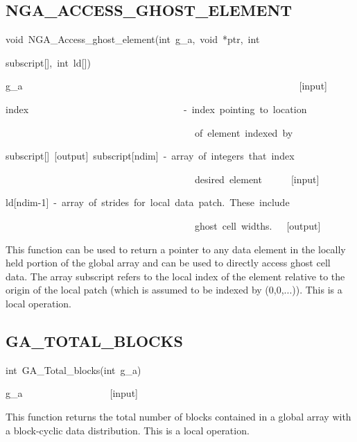 \subsection*{\label{sub:NGA_ACCESS_GHOST_ELEMENT}NGA\_ACCESS\_GHOST\_ELEMENT}
\begin{lyxcode}
void~NGA\_Access\_ghost\_element(int~g\_a,~void~{*}ptr,~int~

subscript{[}{]},~int~ld{[}{]})



g\_a~~~~~~~~~~~~~~~~~~~~~~~~~~~~~~~~~~~~~~~~~~~~~~~~~~~~~~~~~{[}input{]}~

index~~~~~~~~~~~~~~~~~~~~~~~~~~~~~~~~-~index~pointing~to~location~

~~~~~~~~~~~~~~~~~~~~~~~~~~~~~~~~~~~~~~~of~element~indexed~by~

subscript{[}{]}~{[}output{]}~subscript{[}ndim{]}~-~array~of~integers~that~index~

~~~~~~~~~~~~~~~~~~~~~~~~~~~~~~~~~~~~~~~desired~element~~~~~~{[}input{]}~

ld{[}ndim-1{]}~-~array~of~strides~for~local~data~patch.~These~include~

~~~~~~~~~~~~~~~~~~~~~~~~~~~~~~~~~~~~~~~ghost~cell~widths.~~~{[}output{]}
\end{lyxcode}
This function can be used to return a pointer to any data element
in the locally held portion of the global array and can be used to
directly access ghost cell data. The array subscript refers to the
local index of the element relative to the origin of the local patch
(which is assumed to be indexed by (0,0,...)). This is a local operation. 


\subsection*{\label{sub:GA_TOTAL_BLOCKS}GA\_TOTAL\_BLOCKS}
\begin{lyxcode}
int~GA\_Total\_blocks(int~g\_a)



g\_a~~~~~~~~~~~~~~~~~~{[}input{]}
\end{lyxcode}
This function returns the total number of blocks contained in a global
array with a block-cyclic data distribution. This is a local operation. 


